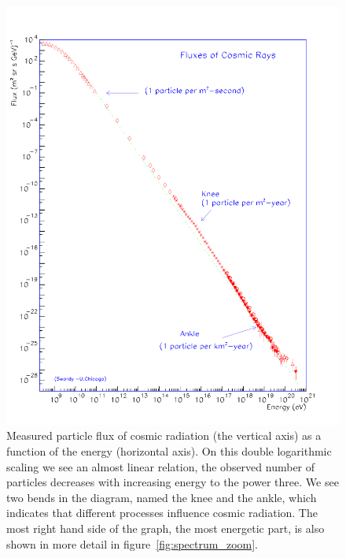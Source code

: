 \documentclass[12pt,a4paper]{article}
\numberwithin{equation}{section}
\numberwithin{figure}{section}
\numberwithin{table}{section}
\begin{document}
\begin{figure}\begin{center}
\includegraphics[scale=0.8]{spectrum.pdf}
\caption{Measured particle flux of cosmic radiation (the vertical axis) as a function of the energy (horizontal axis). On this double logarithmic scaling we see an almost linear relation, the observed number of particles decreases with increasing energy to the power three. We see two bends in the diagram, named the knee and the ankle, which indicates that different processes influence cosmic radiation. The most right hand side of the graph, the most energetic part, is also shown in more detail in figure~\ref{fig:spectrum_zoom}.}\label{fig:spectrum}
\end{center}\end{figure}
\end{document}
